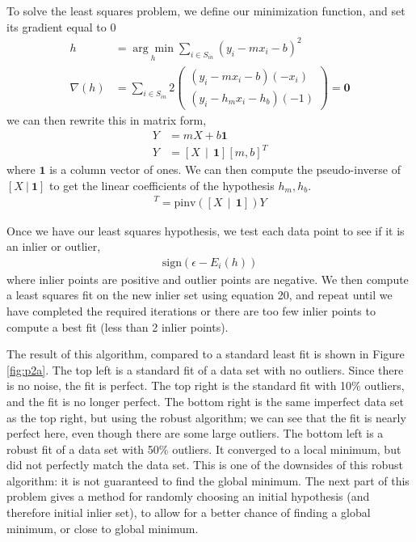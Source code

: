 \documentclass{article}
\begin{document}
To solve the least squares problem, we define our minimization function, and set its gradient equal to 0
\begin{align}
	h &= \underset{h}{\arg\min} \sum_{i\in S_{in}} \left(y_i-mx_i-b\right)^2 \\
	\nabla(h) &= \sum_{i\in S_{in}} 2\begin{pmatrix}
		(y_i - mx_i-b)(-x_i) \\ (y_i - h_mx_i - h_b)(-1) 
	\end{pmatrix} = \mathbf{0}
\end{align}
we can then rewrite this in matrix form,
\begin{align}
	Y &= mX + b\mathbf{1} \\
	Y &= \left[X\ \  |\ \  \mathbf{1}\right]\left[m, b\right]^T
\end{align}
where $\mathbf{1}$ is a column vector of ones. We can then compute the pseudo-inverse of $\left[X\  |\  \mathbf{1}\right]$ to get the linear coefficients of the hypothesis $h_m, h_b$. 
\begin{align}
	[m,b]^T = \text{pinv}\left(\left[X\ \  |\ \  \mathbf{1}\right]\right)Y
\end{align}

Once we have our least squares hypothesis, we test each data point to see if it is an inlier or outlier,
\begin{align}
	\text{sign}\left(\epsilon - E_i(h)\right) 
\end{align}
where inlier points are positive and outlier points are negative. We then compute a least squares fit on the new inlier set using equation 20, and repeat until we have completed the required iterations or there are too few inlier points to compute a best fit (less than 2 inlier points). 

The result of this algorithm, compared to a standard least fit is shown in Figure \ref{fig:p2a}. The top left is a standard fit of a data set with no outliers. Since there is no noise, the fit is perfect. The top right is the standard fit with 10\% outliers, and the fit is no longer perfect. The bottom right is the same imperfect data set as the top right, but using the robust algorithm; we can see that the fit is nearly perfect here, even though there are some large outliers. The bottom left is a robust fit of a data set with 50\% outliers. It converged to a local minimum, but did not perfectly match the data set. This is one of the downsides of this robust algorithm: it is not guaranteed to find the global minimum. The next part of this problem gives a method for randomly choosing an initial hypothesis (and therefore initial inlier set), to allow for a better chance of finding a global minimum, or close to global minimum.
\end{document}
